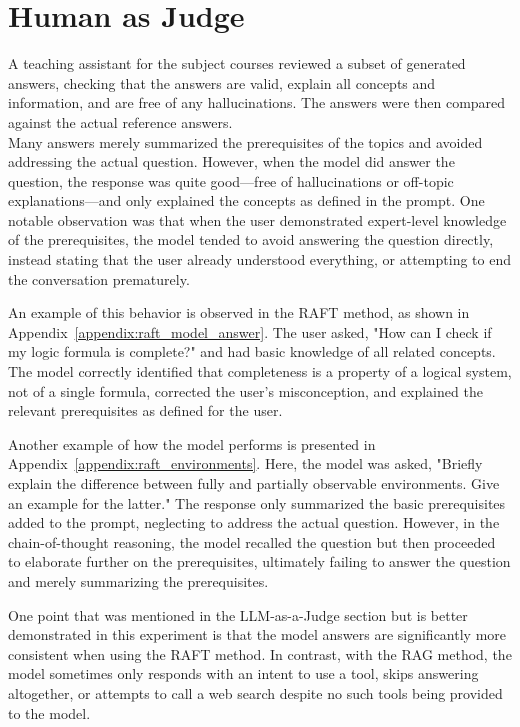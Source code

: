 \section{Human as Judge}

A teaching assistant for the subject courses reviewed a subset of generated answers,
checking that the answers are valid, explain all concepts and information, and are free of any hallucinations. 
The answers were then compared against the actual reference answers.\\

Many answers merely summarized the prerequisites of the topics and avoided addressing the actual question. However, when the model did answer the question, the response was quite good---free of hallucinations or off-topic explanations---and only explained the concepts as defined in the prompt. One notable observation was that when the user demonstrated expert-level knowledge of the prerequisites, the model tended to avoid answering the question directly, instead stating that the user already understood everything, or attempting to end the conversation prematurely.

An example of this behavior is observed in the RAFT method, as shown in Appendix~\ref{appendix:raft_model_answer}. The user asked, "How can I check if my logic formula is complete?" and had basic knowledge of all related concepts. The model correctly identified that completeness is a property of a logical system, not of a single formula, corrected the user's misconception, and explained the relevant prerequisites as defined for the user.

Another example of how the model performs is presented in Appendix~\ref{appendix:raft_environments}. Here, the model was asked, "Briefly explain the difference between fully and partially observable environments. Give an example for the latter." The response only summarized the basic prerequisites added to the prompt, neglecting to address the actual question. However, in the chain-of-thought reasoning, the model recalled the question but then proceeded to elaborate further on the prerequisites, ultimately failing to answer the question and merely summarizing the prerequisites.

One point that was mentioned in the LLM-as-a-Judge section but is better demonstrated in this experiment is that the model answers are significantly more consistent when using the RAFT method. In contrast, with the RAG method, the model sometimes only responds with an intent to use a tool, skips answering altogether, or attempts to call a web search despite no such tools being provided to the model. 
